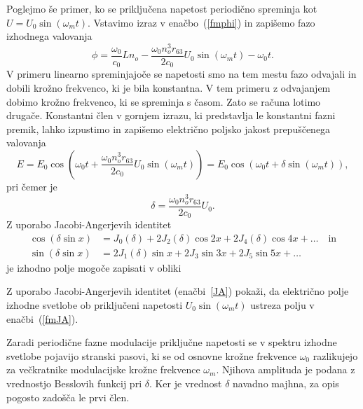 Poglejmo še primer, ko se priključena napetost periodično spreminja kot
$U=U_{0}\sin(\omega_{m}t)$.
Vstavimo izraz v enačbo~(\ref{fmphi}) in zapišemo fazo izhodnega valovanja 
\begin{equation}
\phi = \frac{\omega_0}{c_0}L n_o - \frac{\omega_0 n_o^3 r_{63}}{2c_0} U_0\sin(\omega_{m}t)
- \omega_0 t.
\end{equation}
V primeru linearno spreminjajoče se napetosti smo na tem mestu fazo odvajali in dobili krožno frekvenco, ki 
je bila konstantna. V tem primeru z odvajanjem dobimo krožno frekvenco, ki se spreminja s časom. Zato
se računa lotimo drugače. Konstantni člen v gornjem izrazu, ki predstavlja le konstantni fazni premik, 
lahko izpustimo in zapišemo električno poljsko jakost prepuščenega valovanja  
\begin{equation}
E = E_0 \cos\left( \omega_0 t + \frac{\omega_0 n_o^3 r_{63}}{2c_0} U_0\sin(\omega_{m}t)\right)
= E_0 \cos\left( \omega_0 t + \delta \sin(\omega_{m}t)\right),
\end{equation}
pri čemer je
\begin{equation}
\delta = \frac{\omega_0 n_o^3 r_{63}}{2c_0} U_0.
\end{equation}
Z uporabo Jacobi-Angerjevih identitet 
\begin{align}
\cos\left(\delta\sin x\right)  &=J_0(\delta)+2J_2(\delta)\cos2x+
2J_4(\delta)\cos4x + \ldots\nonumber \quad \mathrm{in}\\
\sin\left(\delta\sin x\right) &=2J_1(\delta)\sin x+2J_3\sin3x+
2J_5\sin5x+\ldots
\label{JA}
\end{align}
je izhodno polje mogoče zapisati v obliki 
\begin{definition}
Z uporabo Jacobi-Angerjevih identitet (enačbi~\ref{JA}) pokaži, da električno polje
izhodne svetlobe ob priključeni napetosti $U_0\sin(\omega_{m}t)$ ustreza
polju v enačbi~(\ref{fmJA}).
\end{definition}
Zaradi periodične fazne modulacije priključne napetosti se v spektru izhodne svetlobe pojavijo stranski pasovi, ki se
od osnovne krožne frekvence $\omega_0$ razlikujejo za večkratnike modulacijske krožne frekvence $\omega_m$. 
Njihova amplituda je podana z vrednostjo Besslovih funkcij pri $\delta$.
Ker je vrednost $\delta$ navadno majhna, za opis pogosto zadošča le prvi člen.

